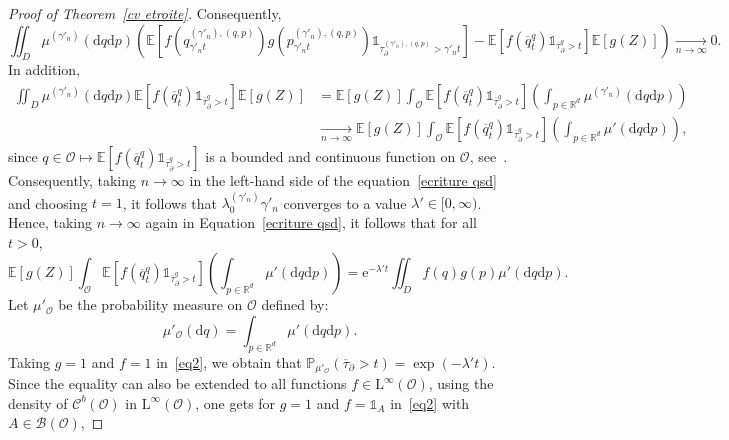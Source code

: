 \documentclass[preprint,EJP]{ejpecp}
\begin{document}
\begin{proof}[Proof of Theorem~\ref{cv etroite}]
Consequently,
$$\iint_{D}\mu^{(\gamma'_n)}(\mathrm{d}q\mathrm{d}p) \left(\mathbb{E}\left[f(q^{(\gamma'_n),(q,p)}_{\gamma'_n t}) g(p^{(\gamma'_n),(q,p)}_{\gamma'_n t}) \mathbb{1}_{\tau^{(\gamma'_n),(q,p)}_\partial>\gamma'_n t}\right]-\mathbb{E}\left[f(\overline{q}^q_t) \mathbb{1}_{\overline{\tau}^{q}_\partial>t}\right] \mathbb{E}\left[g(Z)\right]\right)\underset{n\rightarrow\infty}{\longrightarrow}0.$$
In addition,
\begin{align*}
     \iint_{D}\mu^{(\gamma'_n)}(\mathrm{d}q\mathrm{d}p) \mathbb{E}\left[f(\overline{q}^q_t) \mathbb{1}_{\overline{\tau}^{q}_\partial>t}\right] \mathbb{E}\left[g(Z)\right] 
    &=\mathbb{E}\left[g(Z)\right] \int_{\mathcal{O}}\mathbb{E}\left[f(\overline{q}^q_t) \mathbb{1}_{\overline{\tau}^{q}_\partial>t}\right] \left(\int_{p\in\mathbb{R}^d}\mu^{(\gamma'_n)}(\mathrm{d}q\mathrm{d}p)\right)\\
    &\underset{n\rightarrow\infty}{\longrightarrow}\mathbb{E}\left[g(Z)\right] \int_{\mathcal{O}}\mathbb{E}\left[f(\overline{q}^q_t) \mathbb{1}_{\overline{\tau}^{q}_\partial>t}\right] \left(\int_{p\in\mathbb{R}^d}\mu'(\mathrm{d}q \mathrm{d}p)\right), 
\end{align*}
since $q\in\mathcal{O}\mapsto\mathbb{E}\left[f(\overline{q}^q_t) \mathbb{1}_{\overline{\tau}^{q}_\partial>t}\right]$ is a bounded and continuous function on $\mathcal{O}$, see~\cite[Theorem 6.5.2]{F}. Consequently, taking $n\rightarrow\infty$ in the left-hand side of the equation~\eqref{ecriture qsd} and choosing $t=1$, it follows that $\lambda_0^{(\gamma'_n)}\gamma'_n$ converges to a value $\lambda'\in[0,\infty)$. Hence, taking $n\rightarrow\infty$ again in Equation~\eqref{ecriture qsd}, it follows that for all $t>0$,
\begin{equation}\label{eq2}
    \mathbb{E}\left[g(Z)\right] \int_{\mathcal{O}}\mathbb{E}\left[f(\overline{q}^q_t) \mathbb{1}_{\overline{\tau}^{q}_\partial>t}\right] \left(\int_{p\in\mathbb{R}^d}\mu'(\mathrm{d}q\mathrm{d}p)\right) =\mathrm{e}^{-\lambda't}\iint_Df(q)g(p)\mu'(\mathrm{d}q \mathrm{d}p).
\end{equation}
 Let $\mu'_\mathcal{O}$ be the probability measure on $\mathcal{O}$ defined by: $$\mu'_\mathcal{O}(\mathrm{d}q) = \int_{p \in \mathbb{R}^d} \mu' (\mathrm{d}q \mathrm{d}p).$$ Taking $g=1$ and $f=1$ in~\eqref{eq2}, we obtain that $\mathbb{P}_{\mu'_\mathcal{O}} (\overline{\tau}_\partial>t) = \exp(- \lambda' t)$. Since the equality can also be extended to all functions $f\in\mathrm{L}^\infty(\mathcal{O})$, using the density of $\mathcal{C}^b(\mathcal{O})$ in $\mathrm{L}^\infty(\mathcal{O})$, one gets for $g=1$ and $f=\mathbb{1}_{A}$ in~\eqref{eq2} with $A\in\mathcal{B}(\mathcal{O})$, 

\end{proof}
\end{document}
